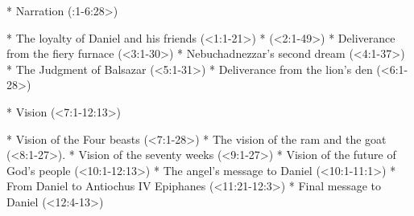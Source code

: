 
\Outline



\begitems
* Narration (:1-6:28>)

  \begitems
  * The loyalty of Daniel and his friends (<1:1-21>)
  * (<2:1-49>)
  * Deliverance from the fiery furnace (<3:1-30>)
  *  Nebuchadnezzar's second dream (<4:1-37>)
  * The Judgment of Balsazar (<5:1-31>)
  * Deliverance from the lion's den (<6:1-28>)
  \enditems

* Vision (<7:1-12:13>)

  \begitems
  * Vision of the Four beasts (<7:1-28>)
  * The vision of the ram and the goat (<8:1-27>).
  * Vision of the seventy weeks (<9:1-27>)
  * Vision of the future of God's people \nl (<10:1-12:13>)
    \begitems
    * The angel's message to Daniel \nl (<10:1-11:1>)
    * From Daniel to Antiochus IV Epiphanes \nl (<11:21-12:3>)
    * Final message to Daniel \nl (<12:4-13>)
    \enditems
  \enditems
\enditems

